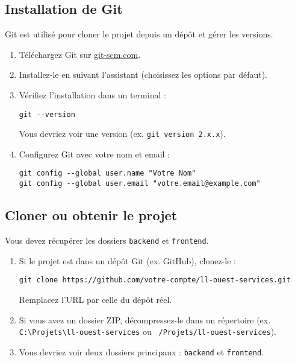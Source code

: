 \documentclass[12pt, a4paper]{article}
\begin{document}
\subsection{Installation de Git}
\begin{stepbox}
Git est utilisé pour cloner le projet depuis un dépôt et gérer les versions.

\begin{enumerate}
  \item Téléchargez Git sur \href{https://git-scm.com/}{git-scm.com}.
  \item Installez-le en suivant l'assistant (choisissez les options par défaut).
  \item Vérifiez l'installation dans un terminal :
  \begin{lstlisting}
git --version
  \end{lstlisting}
  Vous devriez voir une version (ex. \texttt{git version 2.x.x}).
  \item Configurez Git avec votre nom et email :
  \begin{lstlisting}
git config --global user.name "Votre Nom"
git config --global user.email "votre.email@example.com"
  \end{lstlisting}
\end{enumerate}
\end{stepbox}

\subsection{Cloner ou obtenir le projet}
\begin{stepbox}
Vous devez récupérer les dossiers \texttt{backend} et \texttt{frontend}.

\begin{enumerate}
  \item Si le projet est dans un dépôt Git (ex. GitHub), clonez-le :
  \begin{lstlisting}
git clone https://github.com/votre-compte/ll-ouest-services.git
  \end{lstlisting}
  Remplacez l'URL par celle du dépôt réel.
  \item Si vous avez un dossier ZIP, décompressez-le dans un répertoire (ex. \texttt{C:\textbackslash Projets\textbackslash ll-ouest-services} ou \texttt{~/Projets/ll-ouest-services}).
  \item Vous devriez voir deux dossiers principaux : \texttt{backend} et \texttt{frontend}.
\end{enumerate}
\end{stepbox}
\end{document}
